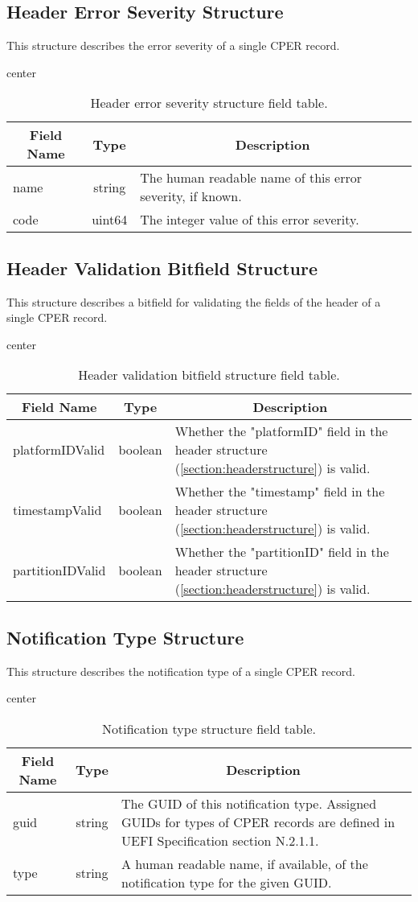 \documentclass{report}
\newcommand*{\thead}[1]{\multicolumn{1}{|c|}{\bfseries #1}}
\newcommand*{\jsontable}[1]{
    \begin{table}[!ht]
    \label{#1}
    \centering
    \begin{adjustbox}{center}
    \begin{tabular}{|l|c|p{8cm}|}
    \hline
    \thead{Field Name} & \thead{Type} & \thead{Description} \\
    \hline
}
\newcommand*{\jsontableend}[1]{
    \hline
    \end{tabular}
    \end{adjustbox}
    \caption{#1}
    \label{table:#1}
    \end{table}
    \FloatBarrier
}
\begin{document}
\subsection{Header Error Severity Structure}
\label{subsection:headererrorseveritystructure}
This structure describes the error severity of a single CPER record.
\jsontable{table:headererrorseveritystructure}
name & string & The human readable name of this error severity, if known. \\
\hline
code & uint64 & The integer value of this error severity. \\
\jsontableend{Header error severity structure field table.}

\subsection{Header Validation Bitfield Structure}
\label{subsection:headervalidbitfieldstructure}
This structure describes a bitfield for validating the fields of the header of a single CPER record.
\jsontable{table:headervalidbitfieldstructure}
platformIDValid & boolean & Whether the "platformID" field in the header structure (\ref{section:headerstructure}) is valid. \\
\hline
timestampValid & boolean & Whether the "timestamp" field in the header structure (\ref{section:headerstructure}) is valid. \\
\hline
partitionIDValid & boolean & Whether the "partitionID" field in the header structure (\ref{section:headerstructure}) is valid.\\
\jsontableend{Header validation bitfield structure field table.}

\subsection{Notification Type Structure}
\label{subsection:notificationtypestructure}
This structure describes the notification type of a single CPER record.
\jsontable{table:notificationtypestructure}
guid & string & The GUID of this notification type. Assigned GUIDs for types of CPER records are defined in UEFI Specification section N.2.1.1.\\
\hline
type & string & A human readable name, if available, of the notification type for the given GUID.\\
\jsontableend{Notification type structure field table.}

\end{document}
